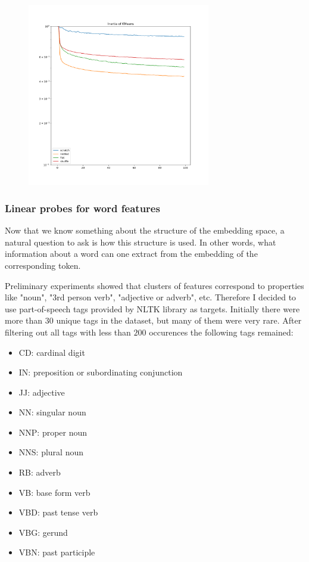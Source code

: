 \documentclass[a4paper, 11pt, oneside]{article}
\begin{document}
	\begin{figure}[t]
		\includegraphics[width=8cm]{img/clusters.png}
		\centering
	\end{figure}

	\subsubsection{Linear probes for word features}

	Now that we know something about the structure of the embedding space, a natural
	question to ask is how this structure is used. In other words, what information
	about a word can one extract from the embedding of the corresponding token.

	Preliminary experiments showed that clusters of features correspond to properties
	like "noun", "3rd person verb", "adjective or adverb", etc. Therefore I decided
	to use part-of-speech tags provided by NLTK library as targets. Initially
	there were more than $30$ unique tags in the dataset, but many of them were very
	rare. After filtering out all tags with less than $200$ occurences the
	following tags remained:
	\begin{itemize}
		\item CD: cardinal digit

		\item IN: preposition or subordinating conjunction

		\item JJ: adjective

		\item NN: singular noun

		\item NNP: proper noun

		\item NNS: plural noun

		\item RB: adverb

		\item VB: base form verb

		\item VBD: past tense verb

		\item VBG: gerund

		\item VBN: past participle
	\end{itemize}
\end{document}
